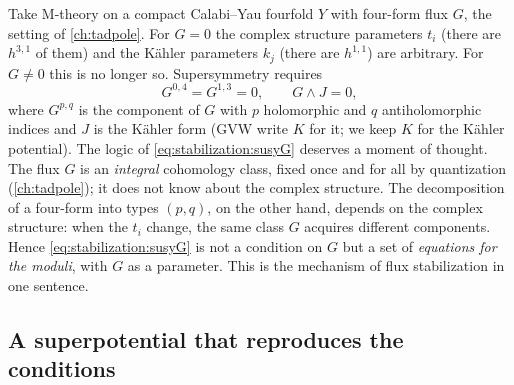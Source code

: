 Take M-theory on a compact Calabi--Yau fourfold $Y$ with four-form flux $G$, the setting of
\cref{ch:tadpole}. For $G=0$ the complex structure parameters $t_i$ (there are $h^{3,1}$ of
them) and the K\"ahler parameters $k_j$ (there are $h^{1,1}$) are arbitrary. For $G\neq0$ this
is no longer so. Supersymmetry requires 
\begin{equation}\label{eq:stabilization:susyG}
 G^{0,4}=G^{1,3}=0,\qquad G\wedge J=0 ,
\end{equation}
where $G^{p,q}$ is the component of $G$ with $p$ holomorphic and $q$ antiholomorphic indices
and $J$ is the K\"ahler form (GVW write $K$ for it; we keep $K$ for the K\"ahler potential).
The logic of \eqref{eq:stabilization:susyG} deserves a moment of thought. The flux $G$ is an
\emph{integral} cohomology class, fixed once and for all by quantization
(\cref{ch:tadpole}); it does not know about the complex structure. The decomposition of a
four-form into types $(p,q)$, on the other hand, depends on the complex structure: when the
$t_i$ change, the same class $G$ acquires different components. Hence
\eqref{eq:stabilization:susyG} is not a condition on $G$ but a set of \emph{equations for the
moduli}, with $G$ as a parameter. This is the mechanism of flux stabilization in one sentence.

\subsection{A superpotential that reproduces the conditions}

